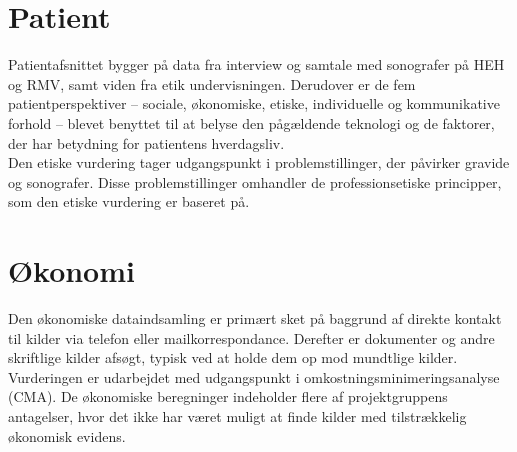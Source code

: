 \section{Patient}
Patientafsnittet bygger på data fra interview og samtale med sonografer på HEH og RMV, samt viden fra etik undervisningen. Derudover er de fem patientperspektiver – sociale, økonomiske, etiske, individuelle og kommunikative forhold – blevet benyttet til at belyse den pågældende teknologi og de faktorer, der har betydning for patientens hverdagsliv.\\ 
Den etiske vurdering tager udgangspunkt i problemstillinger, der påvirker gravide og sonografer. Disse problemstillinger omhandler de professionsetiske principper, som den etiske vurdering er baseret på.


\section{Økonomi}
Den økonomiske dataindsamling er primært sket på baggrund af direkte kontakt til kilder via telefon eller mailkorrespondance. Derefter er dokumenter og andre skriftlige kilder afsøgt, typisk ved at holde dem op mod mundtlige kilder. Vurderingen er udarbejdet med udgangspunkt i omkostningsminimeringsanalyse (CMA). De økonomiske beregninger indeholder flere af projektgruppens antagelser, hvor det ikke har været muligt at finde kilder med tilstrækkelig økonomisk evidens. 